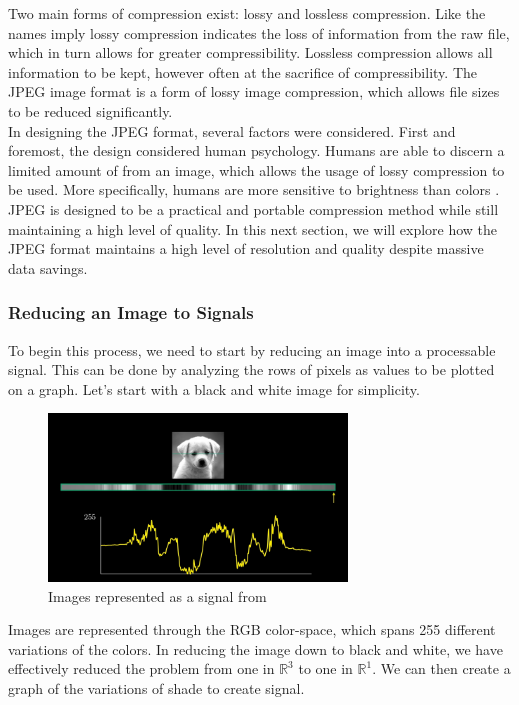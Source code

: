 \documentclass[11pt]{article}
\newcommand{\R}{\mathbb{R}}
\begin{document}
Two main forms of compression exist: lossy and lossless compression. Like the names imply lossy compression indicates the loss of information from the raw file, which in turn allows for greater compressibility. Lossless compression allows all information to be kept, however often at the sacrifice of compressibility. The JPEG image format is a form of lossy image compression, which allows file sizes to be reduced significantly.\\

In designing the JPEG format, several factors were considered. First and foremost, the design considered human psychology. Humans are able to discern a limited amount of from an image, which allows the usage of lossy compression to be used. More specifically, humans are more sensitive to brightness than colors \cite{website:jpeg}. JPEG is designed to be a practical and portable compression method while still maintaining a high level of quality. In this next section, we will explore how the JPEG format maintains a high level of resolution and quality despite massive data savings.

\subsubsection{Reducing an Image to Signals}

To begin this process, we need to start by reducing an image into a processable signal. This can be done by analyzing the rows of pixels as values to be plotted on a graph. Let's start with a black and white image for simplicity.

\begin{figure}[H]
    \begin{center}
    \includegraphics[width = 300px]{figures/jpegSignal.png}
    \caption{Images represented as a signal from \cite{website:jpeg}}
    \label{fig:jpegSignal}
    \end{center} 
\end{figure}
    
Images are represented through the RGB color-space, which spans 255 different variations of the colors. In reducing the image down to black and white, we have effectively reduced the problem from one in $\R^3$ to one in $\R^1$. We can then create a graph of the variations of shade to create signal.\\
\end{document}
